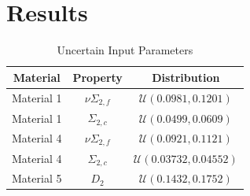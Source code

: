 \documentclass{anstrans}
\begin{document}
\section{Results}\label{results}

\begin{table}[H]
\centering
\begin{tabular}{c|c|c}
Material & Property & Distribution \\ \hline
Material 1 & $\nu\Sigma_{2,f}$ & $\mathcal{U}(0.0981,0.1201)$ \\
Material 1 & $\Sigma_{2,c}$ & $\mathcal{U}(0.0499,0.0609)$  \\
Material 4 & $\nu\Sigma_{2,f}$ & $\mathcal{U}(0.0921,0.1121)$ \\
Material 4 & $\Sigma_{2,c}$ & $\mathcal{U}(0.03732,0.04552)$  \\
Material 5 & $D_2$ & $\mathcal{U}(0.1432,0.1752)$ 
\end{tabular}
\caption{Uncertain Input Parameters}
\label{params}
\end{table}
\end{document}
